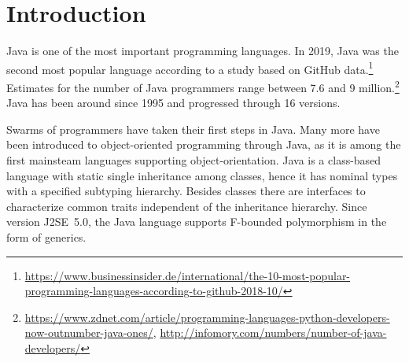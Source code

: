 \section{Introduction}
\label{sec:introduction}

Java is one of the most important programming languages. In 2019, Java
was the second most popular language according to a study
based on GitHub
data.\footnote{\url{https://www.businessinsider.de/international/the-10-most-popular-programming-languages-according-to-github-2018-10/}} Estimates
for the number of Java programmers range between 7.6 and 9 million.\footnote{\url{https://www.zdnet.com/article/programming-languages-python-developers-now-outnumber-java-ones/},
\url{http://infomory.com/numbers/number-of-java-developers/}} Java
has been around since 1995 and progressed through 16 versions.

Swarms of programmers have taken their first steps in Java. Many more
have been introduced to object-oriented programming through Java, as
it is among the first mainsteam languages supporting
object-orientation. Java is a class-based language with static single inheritance among
classes, hence it has nominal types with a specified subtyping
hierarchy. Besides classes there are interfaces to characterize common 
traits independent of the inheritance hierarchy. Since version J2SE~5.0,
the Java language supports F-bounded polymorphism in the form of generics.


